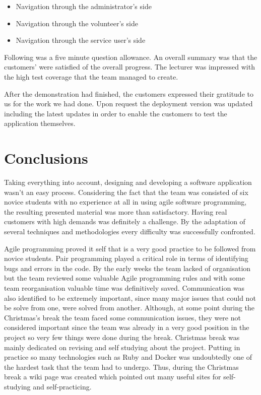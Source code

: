 \documentclass{l3proj}
\begin{document}
\begin{itemize}
	\item Navigation through the administrator's side
	\item Navigation through the volunteer's side
	\item Navigation through the service user's side
\end{itemize}

Following was a five minute question allowance. An overall summary was that the customers' were satisfied of the overall progress. The lecturer was impressed with the high test coverage that the team managed to create.

After the demonstration had finished, the customers expressed their gratitude to us for the work we had done. Upon request the deployment version was updated including the latest updates in order to enable the customers to test the application themselves.




\section{Conclusions}

Taking everything into account, designing and developing a software application wasn't an easy process. Considering the fact that the team was consisted of six novice students with no experience at all in using agile software programming, the resulting presented material was more than satisfactory. Having real customers with high demands was definitely a challenge. By the adaptation of several techniques and methodologies every difficulty was successfully confronted.

Agile programming proved it self that is a very good practice to be followed from novice students. Pair programming played a critical role in terms of identifying bugs and errors in the code. By the early weeks the team lacked of organisation but the team reviewed some valuable Agile programming rules and with some team reorganisation valuable time was definitively saved. Communication was also identified to be extremely important, since many major issues that could not be solve from one, were solved from another. Although, at some point during the Christmas's break the team faced some communication issues, they were not considered important since the team was already in a very good position in the project so very few things were done during the break. Christmas break was mainly dedicated on revising and self studying about the project. Putting in practice so many technologies such as Ruby and Docker was undoubtedly one of the hardest task that the team had to undergo. Thus, during the Christmas break a wiki page was created which pointed out many useful sites for self-studying and self-practicing.
\end{document}
